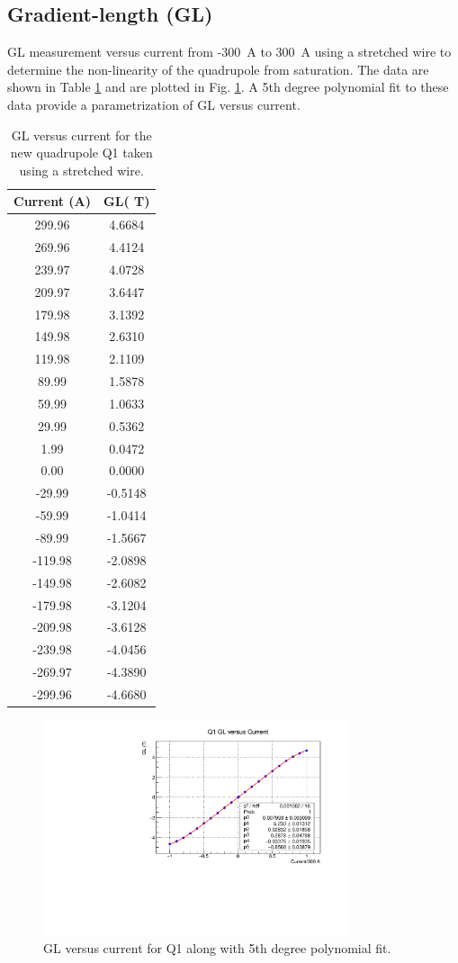 \documentclass[12pt]{article}
\begin{document}
\subsection{Gradient-length (GL)}
GL measurement versus current from -300~A to 300~A using a stretched wire to determine the non-linearity of the quadrupole from saturation. The data are shown in Table \ref{tab:Q1_GLvsCur} and are plotted in Fig. \ref{fig:Q1_GLvsCur}. A 5th degree polynomial fit to these data provide a parametrization of GL versus current.
\begin{table}
\centering
\caption{\label{tab:Q1_GLvsCur}GL versus current for the new quadrupole Q1 taken using a stretched wire.}
\begin{tabular}{|c|c|}
\hline
Current (A)&	GL( T)\\\hline
299.96&	4.6684\\
269.96&	4.4124\\
239.97&	4.0728\\
209.97&	3.6447\\
179.98&	3.1392\\
149.98&	2.6310\\
119.98&	2.1109\\
89.99&	1.5878\\
59.99&	1.0633\\
29.99&	0.5362\\
1.99	  &       0.0472\\
0.00	  &      0.0000\\
-29.99&	-0.5148\\
-59.99&	-1.0414\\
-89.99&	-1.5667\\
-119.98&	-2.0898\\
-149.98&	-2.6082\\
-179.98&	-3.1204\\
-209.98&	-3.6128\\
-239.98&	-4.0456\\
-269.97&	-4.3890\\
-299.96&	-4.6680\\\hline
\end{tabular}
\end{table}
\begin{figure}
\centering
\includegraphics[width=0.8\textwidth]{Q1_GLvsCur.pdf}
\caption{\label{fig:Q1_GLvsCur}GL versus current for Q1 along with 5th degree polynomial fit. }
\end{figure}
\end{document}
